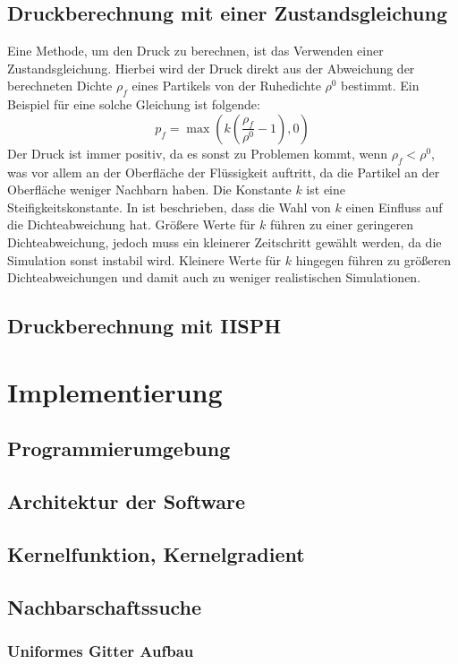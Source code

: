 \documentclass{scrreprt}
\begin{document}
\section{Druckberechnung mit einer Zustandsgleichung}
Eine Methode, um den Druck zu berechnen, ist das Verwenden einer Zustandsgleichung.
Hierbei wird der Druck direkt aus der Abweichung der berechneten Dichte $\rho_f$ eines Partikels von der Ruhedichte $\rho^0$ bestimmt.
Ein Beispiel für eine solche Gleichung ist folgende:
\begin{equation}
    p_f = \max \left(k \left( \frac{\rho_f}{\rho^0} - 1 \right), 0\right)
\end{equation}
Der Druck ist immer positiv, da es sonst zu Problemen kommt, wenn $\rho_f < \rho^0$, was vor allem an der Oberfläche der Flüssigkeit auftritt,
da die Partikel an der Oberfläche weniger Nachbarn haben.
Die Konstante $k$ ist eine Steifigkeitskonstante.
In \cite{koschier_smoothed_2020} ist beschrieben, dass die Wahl von $k$ einen Einfluss auf die Dichteabweichung hat.
Größere Werte für $k$ führen zu einer geringeren Dichteabweichung, jedoch muss ein kleinerer Zeitschritt gewählt werden, da die Simulation sonst instabil wird.
Kleinere Werte für $k$ hingegen führen zu größeren Dichteabweichungen und damit auch zu weniger realistischen Simulationen.

\section{Druckberechnung mit IISPH}
\chapter{Implementierung}
\section{Programmierumgebung}
\section{Architektur der Software}
\section{Kernelfunktion, Kernelgradient}
\section{Nachbarschaftssuche}
\subsection{Uniformes Gitter Aufbau}
\end{document}
